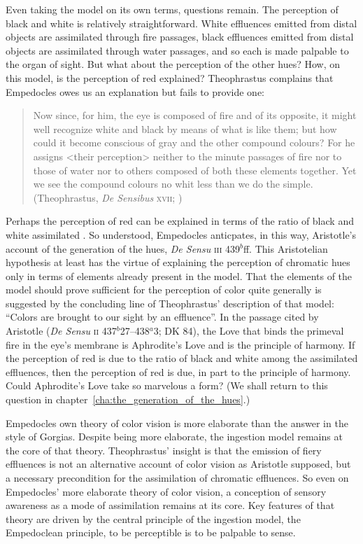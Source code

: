 Even taking the model on its own terms, questions remain. The perception of black and white is relatively straightforward. White effluences emitted from distal objects are assimilated through fire passages, black effluences emitted from distal objects are assimilated through water passages, and so each is made palpable to the organ of sight. But what about the perception of the other hues? How, on this model, is the perception of red explained? Theophrastus complains that Empedocles owes us an explanation but fails to provide one:
\begin{quote}
	Now since, for him, the eye is composed of fire and of its opposite, it might well recognize white and black by means of what is like them; but how could it become conscious of gray and the other compound colours? For he assigns <their perception> neither to the minute passages of fire nor to those of water nor to others composed of both these elements together. Yet we see the compound colours no whit less than we do the simple. (Theophrastus, \emph{De Sensibus} \textsc{xvii}; \citealt[81]{Stratton:1917vn})
\end{quote}
Perhaps the perception of red can be explained in terms of the ratio of black and white assimilated \citep{Ierodiakonou:2005fk}. So understood, Empedocles anticpates, in this way, Aristotle's account of the generation of the hues, \emph{De Sensu} \textsc{iii} 439\( ^{b} \)ff. This Aristotelian hypothesis at least has the virtue of explaining the perception of chromatic hues only in terms of elements already present in the model. That the elements of the model should prove sufficient for the perception of color quite generally is suggested by the concluding line of Theophrastus' description of that model: ``Colors are brought to our sight by an effluence''. In the passage cited by Aristotle (\emph{De Sensu} \textsc{ii} 437\( ^{b} \)27--438\( ^{a} \)3; DK 84), the Love that binds the primeval fire in the eye's membrane is Aphrodite's Love and is the principle of harmony. If the perception of red is due to the ratio of black and white among the assimilated effluences, then the perception of red is due, in part to the principle of harmony. Could Aphrodite's Love take so marvelous a form? (We shall return to this question in chapter~\ref{cha:the_generation_of_the_hues}.)

Empedocles own theory of color vision is more elaborate than the answer in the style of Gorgias. Despite being more elaborate, the ingestion model remains at the core of that theory. Theophrastus' insight is that the emission of fiery effluences is not an alternative account of color vision as Aristotle supposed, but a necessary precondition for the assimilation of chromatic effluences. So even on Empedocles' more elaborate theory of color vision, a conception of sensory awareness as a mode of assimilation remains at its core. Key features of that theory are driven by the central principle of the ingestion model, the Empedoclean principle, to be perceptible is to be palpable to sense.

